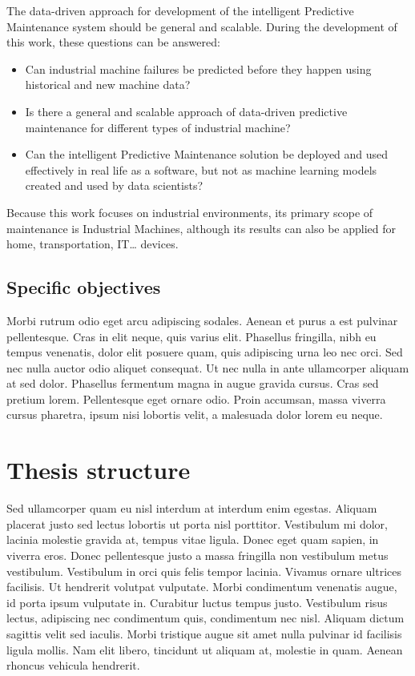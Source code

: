 The data-driven approach for development of the intelligent Predictive Maintenance system should be general and scalable. During the development of this work, these questions can be answered:

\begin{itemize}
\item Can industrial machine failures be predicted before they happen using historical and new machine data?
\item Is there a general and scalable approach of data-driven predictive maintenance for different types of industrial machine?
\item Can the intelligent Predictive Maintenance solution be deployed and used effectively in real life as a software, but not as machine learning models created and used by data scientists?
\end{itemize}

Because this work focuses on industrial environments, its primary scope of maintenance is Industrial Machines, although its results can also be applied for home, transportation, IT… devices.

\subsection{Specific objectives}

Morbi rutrum odio eget arcu adipiscing sodales. Aenean et purus a est pulvinar pellentesque. Cras in elit neque, quis varius elit. Phasellus fringilla, nibh eu tempus venenatis, dolor elit posuere quam, quis adipiscing urna leo nec orci. Sed nec nulla auctor odio aliquet consequat. Ut nec nulla in ante ullamcorper aliquam at sed dolor. Phasellus fermentum magna in augue gravida cursus. Cras sed pretium lorem. Pellentesque eget ornare odio. Proin accumsan, massa viverra cursus pharetra, ipsum nisi lobortis velit, a malesuada dolor lorem eu neque.

\section{Thesis structure}

Sed ullamcorper quam eu nisl interdum at interdum enim egestas. Aliquam placerat justo sed lectus lobortis ut porta nisl porttitor. Vestibulum mi dolor, lacinia molestie gravida at, tempus vitae ligula. Donec eget quam sapien, in viverra eros. Donec pellentesque justo a massa fringilla non vestibulum metus vestibulum. Vestibulum in orci quis felis tempor lacinia. Vivamus ornare ultrices facilisis. Ut hendrerit volutpat vulputate. Morbi condimentum venenatis augue, id porta ipsum vulputate in. Curabitur luctus tempus justo. Vestibulum risus lectus, adipiscing nec condimentum quis, condimentum nec nisl. Aliquam dictum sagittis velit sed iaculis. Morbi tristique augue sit amet nulla pulvinar id facilisis ligula mollis. Nam elit libero, tincidunt ut aliquam at, molestie in quam. Aenean rhoncus vehicula hendrerit.


